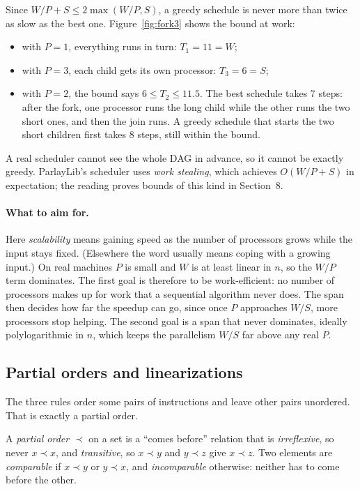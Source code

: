 Since $W/P + S \le 2\max(W/P, S)$, a greedy schedule is never more than twice as slow as the best one. Figure~\ref{fig:fork3} shows the bound at work:
\begin{itemize}
  \item with $P = 1$, everything runs in turn: $T_1 = 11 = W$;
  \item with $P = 3$, each child gets its own processor: $T_3 = 6 = S$;
  \item with $P = 2$, the bound says $6 \le T_2 \le 11.5$. The best schedule takes 7 steps: after the fork, one processor runs the long child while the other runs the two short ones, and then the join runs. A greedy schedule that starts the two short children first takes 8 steps, still within the bound.
\end{itemize}
A real scheduler cannot see the whole DAG in advance, so it cannot be exactly greedy. ParlayLib's scheduler uses \emph{work stealing}, which achieves $O(W/P + S)$ in expectation; the reading proves bounds of this kind in Section~8.

\paragraph{What to aim for.} Here \emph{scalability} means gaining speed as the number of processors grows while the input stays fixed. (Elsewhere the word usually means coping with a growing input.) On real machines $P$ is small and $W$ is at least linear in $n$, so the $W/P$ term dominates. The first goal is therefore to be work-efficient: no number of processors makes up for work that a sequential algorithm never does. The span then decides how far the speedup can go, since once $P$ approaches $W/S$, more processors stop helping. The second goal is a span that never dominates, ideally polylogarithmic in $n$, which keeps the parallelism $W/S$ far above any real $P$.

\subsection{Partial orders and linearizations}

The three rules order some pairs of instructions and leave other pairs unordered. That is exactly a partial order.

\begin{definition}
A \emph{partial order} $\prec$ on a set is a ``comes before'' relation that is \emph{irreflexive}, so never $x \prec x$, and \emph{transitive}, so $x \prec y$ and $y \prec z$ give $x \prec z$. Two elements are \emph{comparable} if $x \prec y$ or $y \prec x$, and \emph{incomparable} otherwise: neither has to come before the other.
\end{definition}

